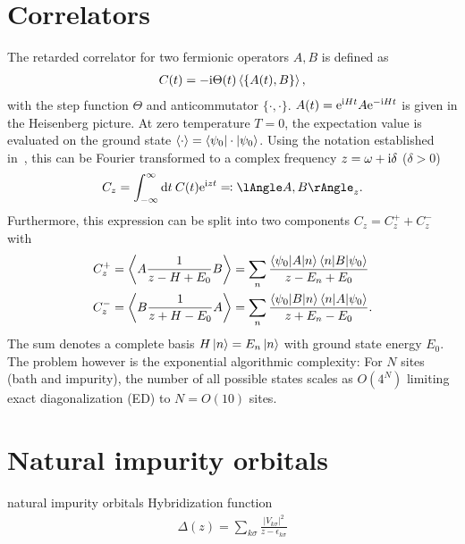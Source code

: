 \section{Correlators}

The retarded correlator for two fermionic operators $A, B$ is defined as
\begin{align}
    C(t) = -\mathrm{i} \Theta(t) \braket{\{A(t), B\}},
\end{align}
with the step function $\Theta$ and anticommutator $\{\cdot,\cdot\}$.
$A(t) = \mathrm{e}^{\mathrm{i} H t} A \mathrm{e}^{-\mathrm{i} H t}$ is given in the Heisenberg picture.
At zero temperature $T=0$, the expectation value is evaluated on the ground state
$\braket{\cdot} = \braket{\psi_0 | \cdot | \psi_0}$.
Using the notation established in~\cite{Bulla1998},
this can be Fourier transformed to a complex frequency $z = \omega + \mathrm{i} \delta$ ($\delta > 0$)
\begin{align}
    C_z = \int_{-\infty}^\infty \md t\>C(t) \me^{\mi zt} \eqqcolon \lAngle A, B \rAngle_z.
\end{align}
Furthermore, this expression can be split into two components $C_z = C^+_z + C^-_z$ with
\begin{subequations}
    \begin{align}
        C^+_z
         & =
        \Braket{A \frac{1}{z - H + E_0} B}
        =
        \sum_n \frac{\braket{\psi_0 | A | n}\braket{n | B | \psi_0}}{z - E_n + E_0}
        \\
        C^-_z
         & =
        \Braket{B \frac{1}{z + H - E_0} A}
        =
        \sum_n \frac{\braket{\psi_0 | B | n}\braket{n | A | \psi_0}}{z + E_n - E_0}.
    \end{align}
\end{subequations}
The sum denotes a complete basis $H\ket{n} = E_n\ket{n}$ with ground state energy $E_0$.
The problem however is the exponential algorithmic complexity:
For $N$ sites (bath and impurity), the number of all possible states scales as $O(4^N)$
limiting exact diagonalization (ED) to $N=O(10)$ sites.

\section{Natural impurity orbitals}

natural impurity orbitals
Hybridization function
\begin{align}
    \Delta(z) = \sum_{k\sigma} \frac{|V_{k\sigma}|^2}{z - \epsilon_{k\sigma}}
\end{align}

